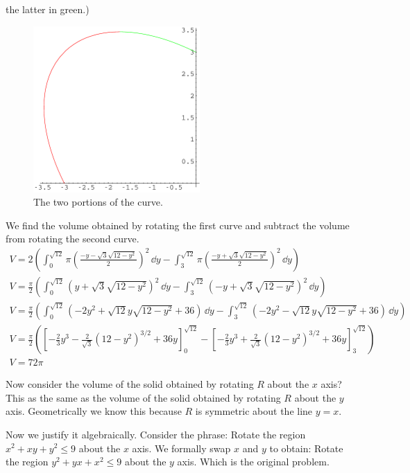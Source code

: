 \begin{Solution}
  the latter in green.)
  \begin{figure}[h!]
    \begin{center}
      \includegraphics[height=2.5in]{calculus/vector/x2xyy29q2}
    \end{center}
    \caption{The two portions of the curve.}
    \label{figure x2xyy29q2}
  \end{figure}
  We find the volume obtained by rotating the first curve and subtract the 
  volume from rotating the second curve.
  \begin{gather*}
    V = 2 \left( \int_0^{\sqrt{12}} \pi \left( 
        \frac{-y - \sqrt{3} \sqrt{12 - y^2}}{2} \right)^2 \,\dd y
      - \int_3^{\sqrt{12}} \pi \left( 
        \frac{-y + \sqrt{3} \sqrt{12 - y^2}}{2} \right)^2 \,\dd y \right)
    \\
    V = \frac{\pi}{2} \left( \int_0^{\sqrt{12}} \left( 
        y + \sqrt{3} \sqrt{12 - y^2} \right)^2 \,\dd y
      - \int_3^{\sqrt{12}}  \left( 
        -y + \sqrt{3} \sqrt{12 - y^2} \right)^2 \,\dd y \right)
    \\
    V = \frac{\pi}{2} \left( \int_0^{\sqrt{12}} \left( 
        -2 y^2 + \sqrt{12} y \sqrt{12 - y^2} + 36 \right) \,\dd y
      - \int_3^{\sqrt{12}} \left( 
        -2 y^2 - \sqrt{12} y \sqrt{12 - y^2} + 36 \right) \,\dd y \right)
    \\
    V = \frac{\pi}{2} \left( 
      \left[ - \frac{2}{3} y^3 
        - \frac{2}{\sqrt{3}} \left( 12 - y^2 \right)^{3/2} + 36 y \right]_0^{\sqrt{12}}
      - \left[ - \frac{2}{3} y^3 
        + \frac{2}{\sqrt{3}} \left( 12 - y^2 \right)^{3/2} + 36 y \right]_3^{\sqrt{12}}
    \right)
    \\
    \boxed{
      V = 72 \pi
      }
  \end{gather*}

  Now consider the volume of the solid obtained by rotating $R$ 
  about the $x$ axis?  This as the same as the volume of the solid obtained
  by rotating $R$ about the $y$ axis.  Geometrically we know this because
  $R$ is symmetric about the line $y = x$.

  Now we justify it algebraically.  Consider the phrase: Rotate the region
  $x^2 + x y + y^2 \leq 9$ about the $x$ axis.  We formally swap $x$ and $y$ to 
  obtain: Rotate the region $y^2 + y x + x^2 \leq 9$ about the $y$ axis.  Which
  is the original problem.
\end{Solution}









